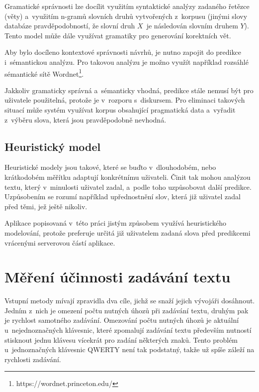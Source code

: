 \documentclass[a4paper,11pt,openany]{book} %
\begin{document}
Gramatické správnosti lze docílit využitím syntaktické analýzy zadaného řetězce (věty) a~využitím n-gramů slovních druhů vytvořených z~korpusu (jinými slovy databáze pravděpodobností, že slovní druh $X$~je následován slovním druhem $Y$). Tento model může dále využívat gramatiky pro generování korektních vět. \parencite[5234--5235]{ghayoomi2009overview}

Aby bylo docíleno kontextové správnosti návrhů, je nutno zapojit do predikce i~sémantickou analýzu. Pro takovou analýzu je možno využít například rozsáhlé sémantické sítě Wordnet\footnote{https://wordnet.princeton.edu/}. \parencite[5235]{ghayoomi2009overview}

Jakkoliv gramaticky správná a~sémanticky vhodná, predikce stále nemusí být pro uživatele použitelná, protože je v~rozporu s~diskursem. Pro eliminaci takových situací může systém využívat korpus obsahující pragmatická data a~vyřadit z~výběru slova, která jsou pravděpodobně nevhodná. \parencite[5235]{ghayoomi2009overview}

\section{Heuristický model}

Heuristické modely jsou takové, které se buďto v~dlouhodobém, nebo krátkodobém měřítku adaptují konkrétnímu uživateli. Činit tak mohou analýzou textu, který v~minulosti uživatel zadal, a~podle toho uzpůsobovat další predikce. Uzpůsobením se rozumí například upřednostnění slov, která již uživatel zadal před těmi, jež ještě nikoliv. \parencite[5235]{ghayoomi2009overview}

Aplikace popisovaná v~této práci jistým způsobem využívá heuristického modelování, protože preferuje určitá již uživatelem zadaná slova před predikcemi vrácenými serverovou částí aplikace.

\chapter{Měření účinnosti zadávání textu}

Vstupní metody mívají zpravidla dva cíle, jichž se snaží jejich vývojáři dosáhnout. Jedním z~nich je omezení počtu nutných úhozů při zadávání textu, druhým pak je rychlost samotného zadávání. Omezování počtu nutných úhozů je aktuální u~nejednoznačných klávesnic, které zpomalují zadávání textu především nutností stisknout jednu klávesu vícekrát pro zadání některých znaků. Tento problém u~jednoznačných klávesnic QWERTY není tak podstatný, takže už spíše záleží na rychlosti zadávání.
\end{document}
